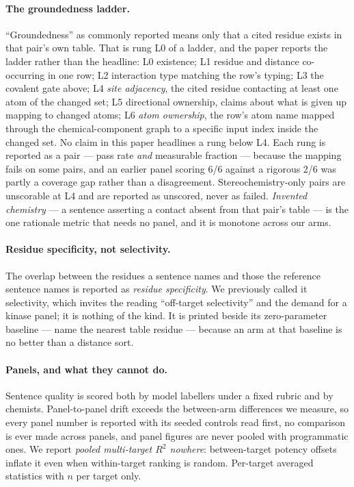 \paragraph{The groundedness ladder.} ``Groundedness'' as commonly reported means only that a cited
residue exists in that pair's own table. That is rung L0 of a ladder, and the paper reports the
ladder rather than the headline: L0 existence; L1 residue and distance co-occurring in one row;
L2 interaction type matching the row's typing; L3 the covalent gate above; L4 \emph{site adjacency},
the cited residue contacting at least one atom of the changed set; L5 directional ownership, claims
about what is given up mapping to changed atoms; L6 \emph{atom ownership}, the row's atom name
mapped through the chemical-component graph to a specific input index inside the changed set. No
claim in this paper headlines a rung below L4. Each rung is reported as a pair --- pass rate
\emph{and} measurable fraction --- because the mapping fails on some pairs, and an earlier panel
scoring 6/6 against a rigorous 2/6 was partly a coverage gap rather than a disagreement.
Stereochemistry-only pairs are unscorable at L4 and are reported as unscored, never as failed.
\emph{Invented chemistry} --- a sentence asserting a contact absent from that pair's table --- is the
one rationale metric that needs no panel, and it is monotone across our arms.

\paragraph{Residue specificity, not selectivity.} The overlap between the residues a sentence names
and those the reference sentence names is reported as \emph{residue specificity}. We previously
called it selectivity, which invites the reading ``off-target selectivity'' and the demand for a
kinase panel; it is nothing of the kind. It is printed beside its zero-parameter baseline --- name
the nearest table residue --- because an arm at that baseline is no better than a distance sort.

\paragraph{Panels, and what they cannot do.} Sentence quality is scored both by model labellers
under a fixed rubric and by chemists. Panel-to-panel drift exceeds the between-arm differences we
measure, so every panel number is reported with its seeded controls read first, no comparison is
ever made across panels, and panel figures are never pooled with programmatic ones. We report
\emph{pooled multi-target $R^2$ nowhere}: between-target potency offsets inflate it even when
within-target ranking is random. Per-target averaged statistics with $n$ per target only.
